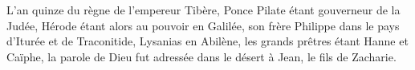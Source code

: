 L’an quinze du règne de l’empereur Tibère,
	Ponce Pilate étant gouverneur de la Judée,
	Hérode étant alors au pouvoir en Galilée,
	son frère Philippe dans le pays d’Iturée et de Traconitide,
	Lysanias en Abilène,
	les grands prêtres étant Hanne et Caïphe,
	la parole de Dieu fut adressée dans le désert à Jean, le fils de Zacharie.
